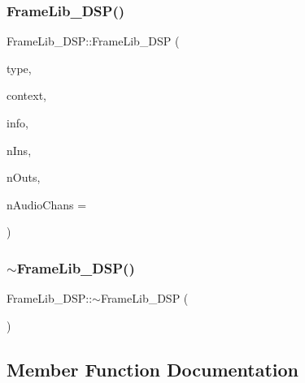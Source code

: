 \subsubsection{\texorpdfstring{Frame\+Lib\+\_\+\+D\+S\+P()}{FrameLib\_DSP()}}
{\footnotesize\ttfamily Frame\+Lib\+\_\+\+D\+S\+P\+::\+Frame\+Lib\+\_\+\+D\+SP (\begin{DoxyParamCaption}\item[{\hyperlink{_frame_lib___types_8h_a842c5e2e69277690b064bf363c017980}{Object\+Type}}]{type,  }\item[{\hyperlink{class_frame_lib___context}{Frame\+Lib\+\_\+\+Context}}]{context,  }\item[{\hyperlink{class_frame_lib___parameters_1_1_info}{Frame\+Lib\+\_\+\+Parameters\+::\+Info} $\ast$}]{info,  }\item[{unsigned long}]{n\+Ins,  }\item[{unsigned long}]{n\+Outs,  }\item[{unsigned long}]{n\+Audio\+Chans = {} }\end{DoxyParamCaption})}

\mbox{\label{class_frame_lib___d_s_p_a2cf489678b72fe7e46956e69fac182ed}} 
\subsubsection{\texorpdfstring{$\sim$\+Frame\+Lib\+\_\+\+D\+S\+P()}{~FrameLib\_DSP()}}
{\footnotesize\ttfamily Frame\+Lib\+\_\+\+D\+S\+P\+::$\sim$\+Frame\+Lib\+\_\+\+D\+SP (\begin{DoxyParamCaption}{ }\end{DoxyParamCaption})}



\subsection{Member Function Documentation}
\mbox{\label{class_frame_lib___d_s_p_a835fc24bc4224279fa53b15bde7a824f}} 

